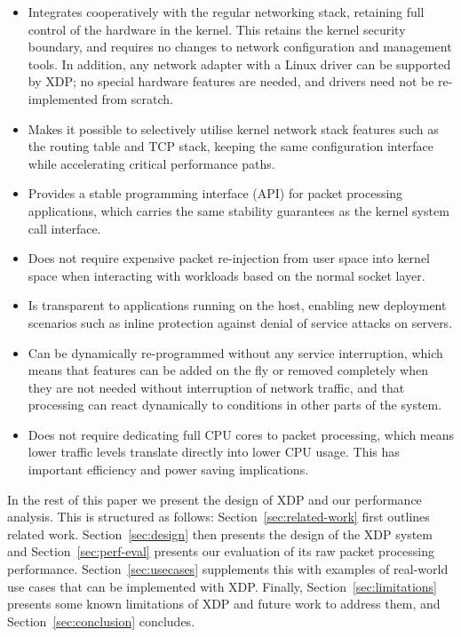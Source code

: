 \documentclass[sigconf]{acmart}
\begin{document}
\begin{itemize}
\item Integrates cooperatively with the regular networking stack, retaining full
  control of the hardware in the kernel. This retains the kernel security
  boundary, and requires no changes to network configuration and management
  tools. In addition, any network adapter with a Linux driver can be supported
  by XDP; no special hardware features are needed, and drivers need not be
  re-implemented from scratch.

\item Makes it possible to selectively utilise kernel network stack features
  such as the routing table and TCP stack, keeping the same configuration
  interface while accelerating critical performance paths.

\item Provides a stable programming interface (API) for packet processing
  applications, which carries the same stability guarantees as the kernel system
  call interface.

\item Does not require expensive packet re-injection from user space into kernel
  space when interacting with workloads based on the normal socket layer.

\item Is transparent to applications running on the host, enabling new
  deployment scenarios such as inline protection against denial of service
  attacks on servers.

\item Can be dynamically re-programmed without any service interruption, which
  means that features can be added on the fly or removed completely when they
  are not needed without interruption of network traffic, and that processing
  can react dynamically to conditions in other parts of the system.

\item Does not require dedicating full CPU cores to packet processing, which
  means lower traffic levels translate directly into lower CPU usage. This has
  important efficiency and power saving implications.
\end{itemize}

In the rest of this paper we present the design of XDP and our performance
analysis. This is structured as follows: Section~\ref{sec:related-work} first
outlines related work. Section~\ref{sec:design} then presents the design of the
XDP system and Section~\ref{sec:perf-eval} presents our evaluation of its raw
packet processing performance. Section~\ref{sec:usecases} supplements this with
examples of real-world use cases that can be implemented with XDP. Finally,
Section~\ref{sec:limitations} presents some known limitations of XDP and future
work to address them, and Section~\ref{sec:conclusion} concludes.
\end{document}
